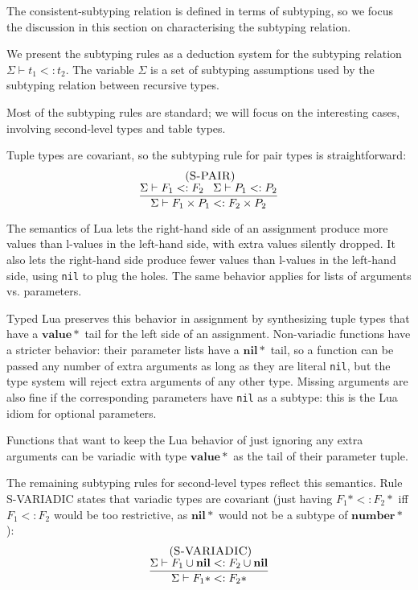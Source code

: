 \documentclass{sigplanconf}
\newcommand{\Value}{\mathbf{value}}
\newcommand{\Nil}{\mathbf{nil}}
\newcommand{\Number}{\mathbf{number}}
\newcommand{\mylabel}[1]{\; (\textsc{#1})}
\newcommand{\senv}{\Sigma}
\newcommand{\subtype}{<:}
\begin{document}
The consistent-subtyping relation is defined in terms
of subtyping, so we focus the discussion in this section
on characterising the subtyping relation.

We present the subtyping rules as a deduction system for the
subtyping relation $\senv \vdash t_{1} \subtype t_{2}$.
The variable $\senv$ is a set of subtyping assumptions used
by the subtyping relation between recursive types.

Most of the subtyping rules are standard; we will focus
on the interesting cases, involving second-level types and
table types.

Tuple types are covariant, so the subtyping rule for pair types is straightforward:
\[
\begin{array}{c}
\mylabel{S-PAIR}\\
\dfrac{\senv \vdash F_{1} \subtype F_{2} \;\;\;
       \senv \vdash P_{1} \subtype P_{2}}
      {\senv \vdash F_{1} \times P_{1} \subtype F_{2} \times P_{2}}
\end{array}
\]

The semantics of Lua lets the right-hand side of an assignment
produce more values than l-values in the left-hand side,
with extra values silently dropped. It also lets the
right-hand side produce fewer values than l-values in the
left-hand side, using {\tt nil} to plug the holes. The
same behavior applies for lists of arguments vs. parameters.

Typed Lua preserves this behavior in assignment by synthesizing
tuple types that have a $\Value{*}$ tail for the left side
of an assignment. Non-variadic functions have a stricter
behavior: their parameter lists have a $\Nil{*}$ tail, so
a function can be passed any number of extra arguments
as long as they are literal {\tt nil}, but the type system will
reject extra arguments of any other type. Missing arguments
are also fine if the corresponding parameters have {\tt nil}
as a subtype: this is the Lua idiom for optional parameters.

Functions that want to keep the Lua behavior of just ignoring
any extra arguments can be variadic with type $\Value{*}$ as
the tail of their parameter tuple.

The remaining subtyping rules for second-level types
reflect this semantics. Rule {\sc S-VARIADIC} states
that variadic types are covariant (just having $F_1{*} \subtype F_2{*}$ iff $F_1 \subtype F_2$ would be too restrictive,
as $\Nil{*}$ would not be a subtype of $\Number{*}$):
\[
\begin{array}{c}
\mylabel{S-VARIADIC}\\
\dfrac{\senv \vdash F_{1} \cup \Nil \subtype F_{2} \cup \Nil}
      {\senv \vdash F_{1}{*} \subtype F_{2}{*}}
\end{array}
\]
\end{document}

